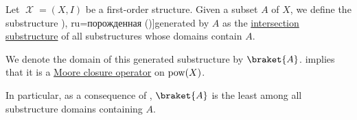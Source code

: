 \begin{definition}\label{def:first_order_generated_substructure}\mimprovised
  Let \( \mscrX = (X, I) \) be a first-order structure. Given a subset \( A \) of \( X \), we define the substructure \term[bg=породена (\cite[110]{ПетровЗяпков2010}), ru=порожденная (\cite[55]{Мальцев1970Системы})]{generated} by \( A \) as the \hyperref[thm:intersection_substructure]{intersection substructure} of all substructures whose domains contain \( A \).

  We denote the domain of this generated substructure by \( \braket{ A } \).  implies that it is a \hyperref[def:moore_closure_operator]{Moore closure operator} on \( \operatorname{pow}(X) \).
\end{definition}
\begin{comments}
  \item In particular, as a consequence of , \( \braket{ A } \) is the least among all substructure domains containing \( A \).
\end{comments}

